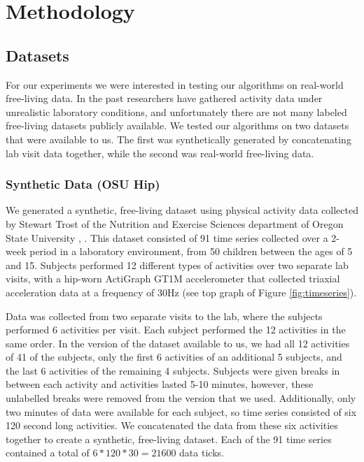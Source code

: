 \chapter{Methodology}

\section{Datasets}
For our experiments we were interested in testing our algorithms on real-world free-living
data. In the past researchers have gathered activity data under unrealistic
laboratory conditions, and unfortunately there are not many labeled free-living
datasets publicly available. We tested our algorithms on two datasets that were
available to us. The first was synthetically generated by concatenating lab
visit data together, while the second was real-world free-living data.

\subsection{Synthetic Data (OSU Hip)}
We generated a synthetic, free-living dataset using physical activity data
collected by Stewart Trost of the Nutrition and Exercise Sciences department of
Oregon State University \cite{trost12}, \cite{zheng12}.
This dataset consisted of 91 time series collected over a 2-week period in a
laboratory environment, from 50 children between the ages of 5 and 15. Subjects
performed 12 different types of activities  over two separate lab visits, with
a hip-worn ActiGraph GT1M accelerometer that collected triaxial acceleration
data at a frequency of 30Hz (see top graph of Figure \ref{fig:timeseries}).

Data was collected from two separate visits to the lab, where the subjects performed 6 activities per visit.
Each subject performed the 12 activities in the same order.
In the version of the dataset available to us, we had all 12 activities of
41 of the subjects, only the first 6 activities of an additional 5 subjects,
and the last 6 activities of the remaining 4 subjects.
Subjects were given breaks in between each activity and activities lasted 5-10
minutes, however, these unlabelled breaks were removed from the version that we
used. Additionally, only two minutes of data were available for each subject, so 
time series consisted of six 120 second long activities. We concatenated the
data from these six activities together to create a synthetic, free-living dataset. 
Each of the 91 time series contained a total of $6*120*30 = 21600$ data ticks.


